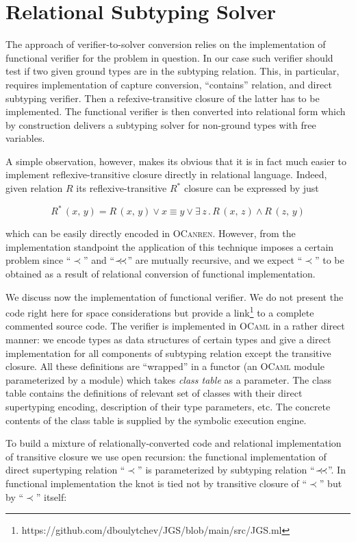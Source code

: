 \section{Relational Subtyping Solver}
\label{sec:solver}

The approach of verifier-to-solver conversion relies on the implementation of functional verifier for the problem in question. In our
case such verifier should test if two given ground types are in the subtyping relation. This, in particular, requires implementation
of capture conversion, ``contains'' relation, and direct subtyping verifier. Then a refexive-transitive closure of the latter has to
be implemented. The functional verifier is then converted into relational form which by construction delivers a subtyping solver for
non-ground types with free variables.

A simple observation, however, makes its obvious that it is in fact much easier to implement reflexive-transitive closure directly
in relational language. Indeed, given relation $R$ its reflexive-transitive $R^*$ closure can be expressed by just

\[
R^*\,(x,\, y) = R\, (x,\, y)\vee x\equiv y\vee\exists\, z\,.\,R\,(x,\,z)\wedge R\,(z,\,y)
\]

which can be easily directly encoded in \textsc{OCanren}. However, from the implementation standpoint the application of this technique
imposes a certain problem since ``$\prec$'' and ``$\prec\mathrel{\mkern-5mu}\prec$'' are mutually recursive, and we expect ``$\prec$'' to be obtained as a
result of relational conversion of functional implementation.

We discuss now the implementation of functional verifier. We do not present the code right here for space considerations but provide
a link\footnote{https://github.com/dboulytchev/JGS/blob/main/src/JGS.ml} to a complete commented source code. The verifier is
implemented in \textsc{OCaml} in a rather direct manner: we encode types as data structures of certain types and give a
direct implementation for all components of subtyping relation except the transitive closure. All these definitions are ``wrapped'' in a
functor (an \textsc{OCaml} module parameterized by a module) which takes \emph{class table} as a parameter. The class table
contains the definitions of relevant set of classes with their direct supertyping encoding, description of their type parameters, etc.
The concrete contents of the class table is supplied by the symbolic execution engine.

To build a mixture of relationally-converted code and relational implementation of transitive closure we use open recursion: the functional
implementation of direct supertyping relation ``$\prec$'' is parameterized by subtyping relation  ``$\prec\mathrel{\mkern-5mu}\prec$''. In functional implementation
the knot is tied not by transitive closure of ``$\prec$'' but by ``$\prec$'' itself:

